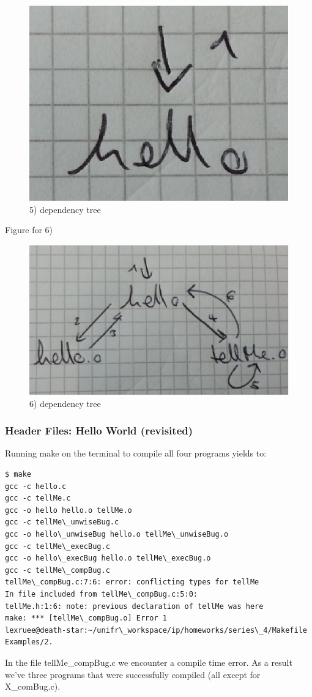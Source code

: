 \documentclass[12pt]{article}
\begin{document}
\begin{figure}[!htb]
\centering
\includegraphics[scale=0.5]{make_dep_q3_5.eps} 
\caption{5) dependency tree}
\end{figure}

Figure for 6)

\begin{figure}[!htb]
\centering
\includegraphics[scale=0.5]{make_dep_q3_6.eps} 
\caption{6) dependency tree}
\end{figure}

\subsubsection*{Header Files: Hello World (revisited)}
Running make on the terminal to compile all four programs yields to:
\begin{lstlisting}
$ make
gcc -c hello.c
gcc -c tellMe.c
gcc -o hello hello.o tellMe.o
gcc -c tellMe\_unwiseBug.c
gcc -o hello\_unwiseBug hello.o tellMe\_unwiseBug.o
gcc -c tellMe\_execBug.c
gcc -o hello\_execBug hello.o tellMe\_execBug.o
gcc -c tellMe\_compBug.c
tellMe\_compBug.c:7:6: error: conflicting types for tellMe
In file included from tellMe\_compBug.c:5:0:
tellMe.h:1:6: note: previous declaration of tellMe was here
make: *** [tellMe\_compBug.o] Error 1
lexruee@death-star:~/unifr\_workspace/ip/homeworks/series\_4/Makefile Examples/2.
\end{lstlisting}
In the file tellMe\_compBug.c we encounter a compile time error.
As a result we've three programs that were successfully compiled (all except for X\_comBug.c).
\end{document}
